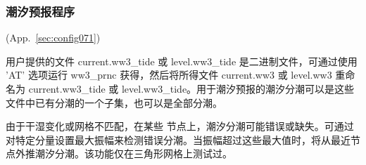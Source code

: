\vsssub
\subsubsection{潮汐预报程序} \label{sub:ww3prtide}
\vsssub

 (App.~\ref{sec:config071})

\vspace{\baselineskip} 
\vspace{\baselineskip} 
\noindent 
用户提供的文件 current.ww3\_tide 或 level.ww3\_tide 是二进制文件，可通过使用 'AT' 选项运行 ww3\_prnc 获得，然后将所得文件 current.ww3 或 level.ww3 重命名为 current.ww3\_tide 或 level.ww3\_tide。用于潮汐预报的潮汐分潮可以是这些文件中已有分潮的一个子集，也可以是全部分潮。

由于干湿变化或网格不匹配，在某些 \ws{} 节点上，潮汐分潮可能错误或缺失。可通过对特定分量设置最大振幅来检测错误分潮。当振幅超过这些最大值时，将从最近节点外推潮汐分潮。该功能仅在三角形网格上测试过。

\pb
